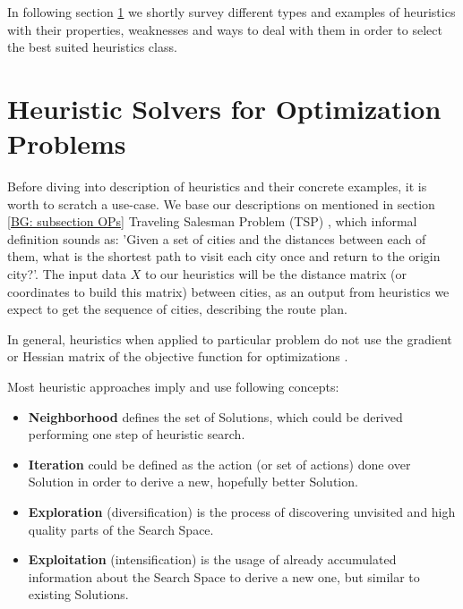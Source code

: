 In following section \ref{bg: heuristics section} we shortly survey different types and examples of heuristics with their properties, weaknesses and ways to deal with them in order to select the best suited heuristics class.


\section{Heuristic Solvers for Optimization Problems}\label{bg: heuristics section}
Before diving into description of heuristics and their concrete examples, it is worth to scratch a use-case. We base our descriptions on mentioned in section \ref{BG: subsection OPs} Traveling Salesman Problem (TSP) \cite{applegate2006traveling}, which informal definition sounds as: 'Given a set of cities and the distances between each of them, what is the shortest path to visit each city once and return to the origin city?'. 
The input data $X$ to our heuristics will be the distance matrix (or coordinates to build this matrix) between cities, as an output from heuristics we expect to get the sequence of cities, describing the route plan.

In general, heuristics when applied to particular problem do not use the gradient or Hessian matrix of the objective function for optimizations \cite{boussaid2013survey}.

Most heuristic approaches imply and use following concepts:
\begin{itemize}
	\item \textbf{Neighborhood} defines the set of Solutions, which could be derived performing one step of heuristic search.
	\item \textbf{Iteration} could be defined as the action (or set of actions) done over Solution in order to derive a new, hopefully better Solution.
	\item \textbf{Exploration} (diversification) is the process of discovering unvisited and high quality parts of the Search Space.
	\item \textbf{Exploitation} (intensification) is the usage of already accumulated information about the Search Space to derive a new one, but similar to existing Solutions.
\end{itemize}



